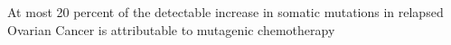 At most 20 percent of the detectable increase in somatic mutations in relapsed Ovarian Cancer is attributable to mutagenic chemotherapy
